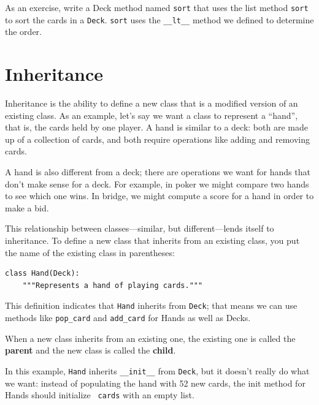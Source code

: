 \documentclass[10pt]{book}
\begin{document}
As an exercise, write a Deck method named {\tt sort} that uses the
list method {\tt sort} to sort the cards in a {\tt Deck}.  {\tt sort}
uses the \verb"__lt__" method we defined to determine the order.
 



\section{Inheritance}

Inheritance is the ability to define a new class that is a modified
version of an existing class.  As an example, let's say we want a
class to represent a ``hand'', that is, the cards held by one player.
A hand is similar to a deck: both are made up of a collection of
cards, and both require operations like adding and removing cards.

A hand is also different from a deck; there are operations we want for
hands that don't make sense for a deck.  For example, in poker we
might compare two hands to see which one wins.  In bridge, we might
compute a score for a hand in order to make a bid.

This relationship between classes---similar, but different---lends
itself to inheritance.
To define a new class that inherits from an existing class,
you put the name of the existing class in parentheses:

\begin{verbatim}
class Hand(Deck):
    """Represents a hand of playing cards."""
\end{verbatim}
%
This definition indicates that {\tt Hand} inherits from {\tt Deck};
that means we can use methods like \verb"pop_card" and \verb"add_card"
for Hands as well as Decks.

When a new class inherits from an existing one, the existing
one is called the {\bf parent} and the new class is
called the {\bf child}.

In this example, {\tt Hand} inherits \verb"__init__" from {\tt Deck},
but it doesn't really do what we want: instead of populating the hand
with 52 new cards, the init method for Hands should initialize {\tt
  cards} with an empty list.   
\end{document}
